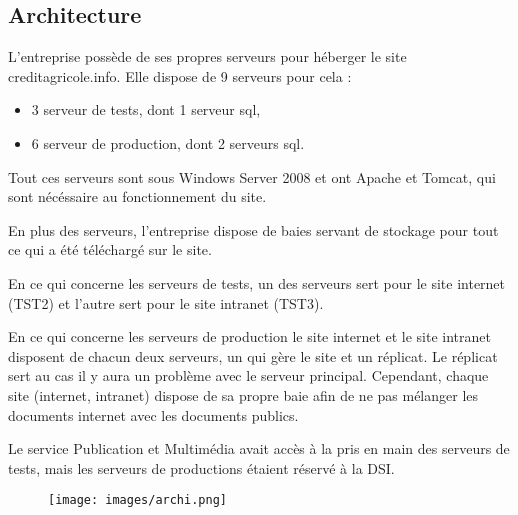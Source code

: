 \documentclass[12pt,a4paper]{article}
\begin{document}
\subsection{Architecture}
L'entreprise possède de ses propres serveurs pour héberger le site creditagricole.info. Elle dispose de 9 serveurs pour cela :
\begin{itemize}
\item 3 serveur de tests, dont 1 serveur sql,
\item 6 serveur de production, dont 2 serveurs sql.
\end{itemize}
Tout ces serveurs sont sous Windows Server 2008 et ont Apache et Tomcat, qui sont nécéssaire au fonctionnement du site.\par
En plus des serveurs, l'entreprise dispose de baies servant de stockage pour tout ce qui a été téléchargé sur le site.\par 
En ce qui concerne les serveurs de tests, un des serveurs sert pour le site internet (TST2) et l'autre sert pour le site intranet (TST3).\par
En ce qui concerne les serveurs de production le site internet et le site intranet disposent de chacun deux serveurs, un qui gère le site et un réplicat. Le réplicat sert au cas il y aura un problème avec le serveur principal. Cependant, chaque site (internet, intranet) dispose de sa propre baie afin de ne pas mélanger les documents internet avec les documents publics.\par
Le service Publication et Multimédia avait accès à la pris en main des serveurs de tests, mais les serveurs de productions étaient réservé à la DSI.\par
\begin{figure}[h!]
\centering
\texttt{[image: images/archi.png]} 
\end{figure}
\end{document}
